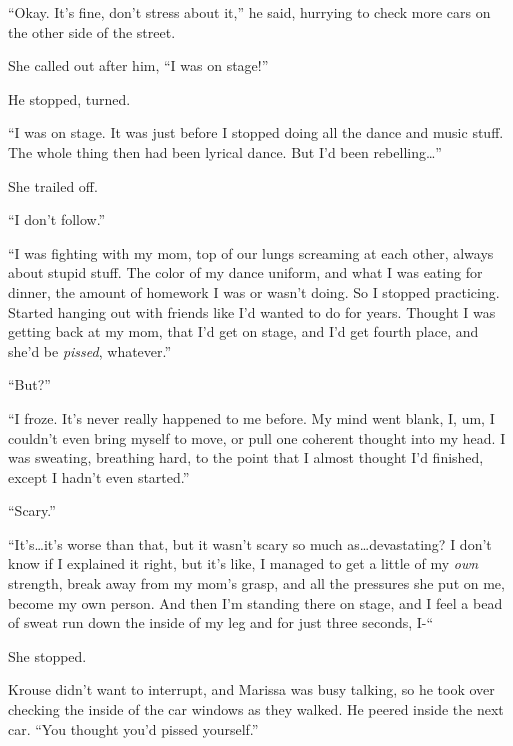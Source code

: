 ``Okay.  It's fine, don't stress about it,'' he said, hurrying to check more cars on the other side of the street.



She called out after him, ``I was on stage!''



He stopped, turned.



``I was on stage.  It was just before I stopped doing all the dance and music stuff.  The whole thing then had been lyrical dance.  But I'd been rebelling\ldots''



She trailed off.



``I don't follow.''



``I was fighting with my mom, top of our lungs screaming at each other, always about stupid stuff.  The color of my dance uniform, and what I was eating for dinner, the amount of homework I was or wasn't doing.  So I stopped practicing.  Started hanging out with friends like I'd wanted to do for years.  Thought I was getting back at my mom, that I'd get on stage, and I'd get fourth place, and she'd be \emph{pissed}, whatever.''



``But?''



``I froze.  It's never really happened to me before.  My mind went blank, I, um, I couldn't even bring myself to move, or pull one coherent thought into my head.  I was sweating, breathing hard, to the point that I almost thought I'd finished, except I hadn't even started.''



``Scary.''



``It's\ldots it's worse than that, but it wasn't scary so much as\ldots devastating?  I don't know if I explained it right, but it's like, I managed to get a little of my \emph{own} strength, break away from my mom's grasp, and all the pressures she put on me, become my own person.  And then I'm standing there on stage, and I feel a bead of sweat run down the inside of my leg and for just three seconds, I-``



She stopped.



Krouse didn't want to interrupt, and Marissa was busy talking, so he took over checking the inside of the car windows as they walked.  He peered inside the next car. ``You thought you'd pissed yourself.''



